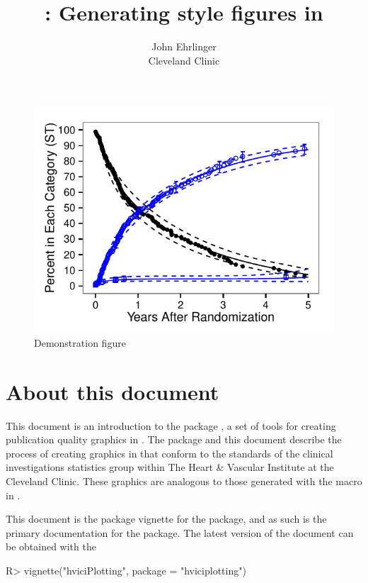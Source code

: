 \documentclass[nojss]{jss}\usepackage[]{graphicx}\usepackage[]{color}
\author{John Ehrlinger\\Cleveland Clinic} %
\title{{\pkg{hviciPlotting}}: Generating \code{plot.sas} style figures in \proglang{R}}
\makeatletter
\def\maxwidth{ %
  \ifdim\Gin@nat@width>\linewidth
    \linewidth
  \else
    \Gin@nat@width
  \fi
}
\newenvironment{knitrout}{}{} %
\makeatother
\begin{document}

\begin{knitrout}\footnotesize
{}\color{fgcolor}\begin{figure}[!htpb]


{\centering \includegraphics[width=\maxwidth]{figure/beamer-introFigure} 

}

\caption[Demonstration figure]{Demonstration figure\label{F:introFigure}}
\end{figure}


\end{knitrout}
\section{About this document}
This document is an introduction to the  package , a set of tools for creating publication quality graphics in . The package and this document describe the process of creating graphics in  that conform to the standards of the clinical investigations statistics group within The Heart \& Vascular Institute at the Cleveland Clinic. These graphics are analogous to those generated with the  macro in .

This document is the package vignette for the  package, and as such is the primary documentation for the package. The latest version of the document can be obtained with the 
\begin{CodeChunk}
\begin{CodeInput}
R> vignette("hviciPlotting", package = "hviciplotting")
\end{CodeInput}
\end{CodeChunk}
\end{document}
